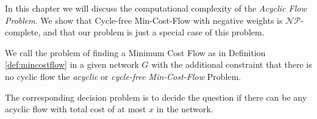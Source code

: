 In this chapter we will discuss the computational complexity of the \textit{Acyclic Flow Problem}. We show that 
Cycle-free Min-Cost-Flow with negative weights is $\mathcal{NP}$-complete, and that our problem is just a special case 
of this problem. 


\begin{definition}
 We call the problem of finding a Minimum Cost Flow as in Definition \ref{def:mincostflow} in a given 
network $G$ with the additional constraint  that there is no cyclic flow the \textit{acyclic} or \textit{cycle-free 
Min-Cost-Flow} Problem. 

The corresponding decision problem is to decide the question if there can be any acyclic flow with total cost of at 
most $x$ in the network.%
\end{definition}

